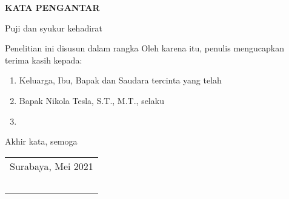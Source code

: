 \begin{center}
  \Large
  \textbf{KATA PENGANTAR}
\end{center}


\vspace{2ex}


Puji dan syukur kehadirat \lipsum[1][1-5]

Penelitian ini disusun dalam rangka \lipsum[2][1-5]
Oleh karena itu, penulis mengucapkan terima kasih kepada:

\begin{enumerate}[nolistsep]

  \item Keluarga, Ibu, Bapak dan Saudara tercinta yang telah \lipsum[3][1-2]

  \item Bapak Nikola Tesla, S.T., M.T., selaku \lipsum[4][1-2]

  \item \lipsum[5][1-3]

\end{enumerate}

Akhir kata, semoga \lipsum[6][1-8]

\begin{flushright}
  \begin{tabular}[b]{c}
    Surabaya, Mei 2021 \\
    \\
    \\
    \\
    \\
    \name{}
  \end{tabular}
\end{flushright}
